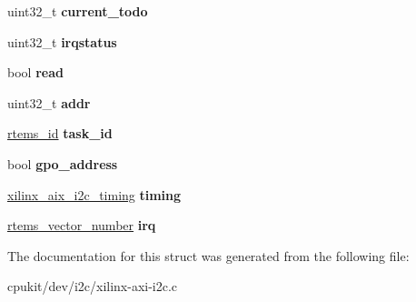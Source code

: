 \begin{DoxyCompactItemize}
uint32\+\_\+t {\bfseries current\+\_\+todo}
\item 
\mbox{\label{structxilinx__axi__i2c__bus_a75821a82bc53fdf0f6ecf5a344d3c726}} 
uint32\+\_\+t {\bfseries irqstatus}
\item 
\mbox{\label{structxilinx__axi__i2c__bus_aa5c63adc36d2c3f2930e586c77b36fcd}} 
bool {\bfseries read}
\item 
\mbox{\label{structxilinx__axi__i2c__bus_a5cc3daec6ac5125a20e624b40b048702}} 
uint32\+\_\+t {\bfseries addr}
\item 
\mbox{\label{structxilinx__axi__i2c__bus_a398f10889e9d7e12efe8d327c13792ec}} 
\mbox{\hyperlink{group__ClassicTasks_gab20892b814dced7dd4e5b9bf42becd57}{rtems\+\_\+id}} {\bfseries task\+\_\+id}
\item 
\mbox{\label{structxilinx__axi__i2c__bus_a277e196c5eed4fa79f444e6f14e8898a}} 
bool {\bfseries gpo\+\_\+address}
\item 
\mbox{\label{structxilinx__axi__i2c__bus_a30e43e3e4dfd705595aab38bc658b887}} 
\mbox{\hyperlink{structxilinx__aix__i2c__timing}{xilinx\+\_\+aix\+\_\+i2c\+\_\+timing}} {\bfseries timing}
\item 
\mbox{\label{structxilinx__axi__i2c__bus_a5e8ffae2d4b7caa016c9553784180df0}} 
\mbox{\hyperlink{group__ClassicINTR_ga3e434c197d99f128e78cae4d9358bd8b}{rtems\+\_\+vector\+\_\+number}} {\bfseries irq}
\end{DoxyCompactItemize}


The documentation for this struct was generated from the following file\+:\begin{DoxyCompactItemize}
\item 
cpukit/dev/i2c/xilinx-\/axi-\/i2c.\+c\end{DoxyCompactItemize}
